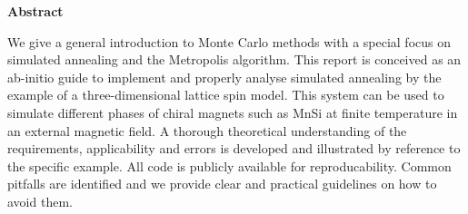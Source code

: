 %
\phantom{}
\bigskip
\bigskip
\bigskip
%
\begin{center}
{\sffamily \bfseries \huge Abstract}
\end{center}
%
\bigskip
\bigskip
%
We give a general introduction to Monte Carlo methods with a special focus on
simulated annealing and the Metropolis algorithm. This report is conceived as an
ab-initio guide to implement and properly analyse simulated annealing by the
example of a three-dimensional lattice spin model. This system can be used to
simulate different phases of chiral magnets such as MnSi at finite temperature
in an external magnetic field. A thorough theoretical understanding of the
requirements, applicability and errors is developed and illustrated by reference
to the specific example. All code is publicly available for reproducability.
Common pitfalls are identified and we provide clear and practical guidelines on
how to avoid them.
